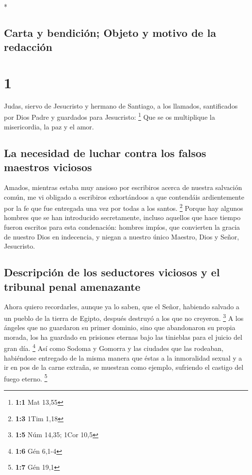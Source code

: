 \begin{paracol}{2} \switchcolumn[0]*

\hypertarget{carta-y-bendiciuxf3n-objeto-y-motivo-de-la-redacciuxf3n}{%
\subsection{Carta y bendición; Objeto y motivo de la
redacción}\label{carta-y-bendiciuxf3n-objeto-y-motivo-de-la-redacciuxf3n}}

\hypertarget{section}{%
\section{1}\label{section}}

 Judas, siervo de Jesucristo y hermano de Santiago, a los
llamados, santificados por Dios Padre y guardados para Jesucristo:
\footnote{\textbf{1:1} Mat 13,55}  Que se os multiplique
la misericordia, la paz y el amor.

\hypertarget{la-necesidad-de-luchar-contra-los-falsos-maestros-viciosos}{%
\subsection{La necesidad de luchar contra los falsos maestros
viciosos}\label{la-necesidad-de-luchar-contra-los-falsos-maestros-viciosos}}

 Amados, mientras estaba muy ansioso por escribiros acerca
de nuestra salvación común, me vi obligado a escribiros exhortándoos a
que contendáis ardientemente por la fe que fue entregada una vez por
todas a los santos. \footnote{\textbf{1:3} 1Tim 1,18} 
Porque hay algunos hombres que se han introducido secretamente, incluso
aquellos que hace tiempo fueron escritos para esta condenación: hombres
impíos, que convierten la gracia de nuestro Dios en indecencia, y niegan
a nuestro único Maestro, Dios y Señor, Jesucristo.

\hypertarget{descripciuxf3n-de-los-seductores-viciosos-y-el-tribunal-penal-amenazante}{%
\subsection{Descripción de los seductores viciosos y el tribunal penal
amenazante}\label{descripciuxf3n-de-los-seductores-viciosos-y-el-tribunal-penal-amenazante}}

 Ahora quiero recordarles, aunque ya lo saben, que el
Señor, habiendo salvado a un pueblo de la tierra de Egipto, después
destruyó a los que no creyeron. \footnote{\textbf{1:5} Núm 14,35; 1Cor
  10,5}  A los ángeles que no guardaron su primer dominio,
sino que abandonaron su propia morada, los ha guardado en prisiones
eternas bajo las tinieblas para el juicio del gran día. \footnote{\textbf{1:6}
  Gén 6,1-4}  Así como Sodoma y Gomorra y las ciudades que
las rodeaban, habiéndose entregado de la misma manera que éstas a la
inmoralidad sexual y a ir en pos de la carne extraña, se muestran como
ejemplo, sufriendo el castigo del fuego eterno. \footnote{\textbf{1:7}
  Gén 19,1}


\end{paracol}
